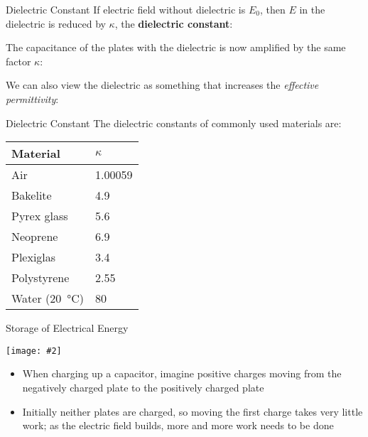 \documentclass[12pt,aspectratio=169]{beamer}
\newcommand{\pic}[2]{\texttt{[image: \#2]}}
\newcommand{\eq}[2]{\vspace{#1}{\Large\begin{displaymath}#2\end{displaymath}}}
\begin{document}
\begin{frame}{Dielectric Constant}
  If electric field without dielectric is $E_0$, then $E$ in the dielectric is
  reduced by $\kappa$, the \textbf{dielectric constant}:

  \eq{-.25in}{
    \boxed{\kappa=\frac{E_0}{E}}
  }

  The capacitance of the plates with the dielectric is now amplified by the
  same factor $\kappa$:

  \eq{-.3in}{
    \boxed{C=\kappa C_0}
  }

  We can also view the dielectric as something that increases the
  \emph{effective permittivity}:
  
  \eq{-.3in}{
    \boxed{\epsilon=\kappa\epsilon_0}
  }
\end{frame}



\begin{frame}{Dielectric Constant}
  The dielectric constants of commonly used materials are:
  \begin{center}
    \begin{tabular}{l|l}
      \rowcolor{pink}
      \textbf{Material} & $\kappa$ \\ \hline
      Air         & \num{1.00059} \\
      Bakelite    & \num{4.9} \\
      Pyrex glass & \num{5.6} \\
      Neoprene    & \num{6.9} \\
      Plexiglas   & \num{3.4} \\
      Polystyrene & \num{2.55} \\
      Water (\SI{20}{\celsius}) & \num{80} 
    \end{tabular}
  \end{center}
\end{frame}


\begin{frame}{Storage of Electrical Energy}
  \begin{center}
    \pic{.45}{slide14}
  \end{center}
  \begin{itemize}
  \item When charging up a capacitor, imagine positive charges moving from the
    negatively charged plate to the positively charged plate
  \item Initially neither plates are charged, so moving the first charge takes
    very little work; as the electric field builds, more and more work needs
    to be done
  \end{itemize}
\end{frame}
\end{document}
